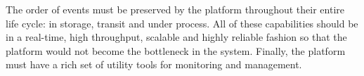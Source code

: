 The order of events must be preserved by the platform throughout their entire life cycle: in storage, transit and under process. All of these capabilities should be in a real-time, high throughput, scalable and highly reliable fashion so that the platform would not become the bottleneck in the system. Finally, the platform must have a rich set of utility tools for monitoring and management.



